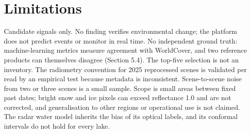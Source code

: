 \documentclass[11pt]{article}
\begin{document}
\section{Limitations}

Candidate signals only. No finding verifies environmental change; the platform does not predict events or monitor in real time. No independent ground truth: machine-learning metrics measure agreement with WorldCover, and two reference products can themselves disagree (Section 5.4). The top-five selection is not an inventory. The radiometry convention for 2025 reprocessed scenes is validated per read by an empirical test because metadata is inconsistent. Scene-to-scene noise from two or three scenes is a small sample. Scope is small areas between fixed past dates; bright snow and ice pixels can exceed reflectance 1.0 and are not corrected, and generalisation to other regions or operational use is not claimed. The radar water model inherits the bias of its optical labels, and its conformal intervals do not hold for every lake.



\end{document}
